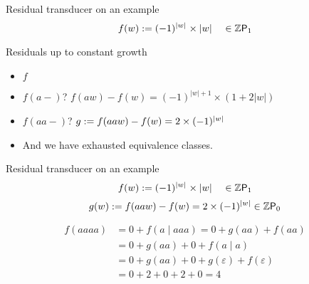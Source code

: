 \documentclass{beamer}
\begin{document}
\begin{frame}{Residual transducer on an example}
    \begin{equation*}
        f(w) \defined (-1)^{\size{w}} \times \size{w}
        \quad 
        \in \Zpoly[1]
    \end{equation*}
    \pause
    \begin{block}{Residuals up to constant growth}
        \begin{itemize}
            \item $f$ \pause
            \item $f(a-)$? 
                \pause $f(aw) - f(w) = (-1)^{|w| + 1} \times ( 1 + 2|w| )$
                \pause \nokmark
            \item $f(aa-)$? 
                \pause
                $g \mathrel{:=} f(aaw) - f(w)
                = 2 \times (-1)^{|w|}$
                \pause 
                \okmark
            \item And we have exhausted equivalence classes.
        \end{itemize}
    \end{block}
    \pause
\end{frame}
\begin{frame}{Residual transducer on an example}
    \begin{equation*}
        f(w) \defined (-1)^{\size{w}} \times \size{w}
        \quad 
        \in \Zpoly[1]
    \end{equation*}
    \begin{equation*}
        g(w) \defined f(aaw) - f(w) = 2 \times (-1)^{|w|} \in \Zpoly[0]
    \end{equation*}
    \begin{center}
    \end{center}
    \pause
    \begin{align*}
        f(aaaa) &= 0 + f(a \mid aaa) = 0 + g(aa) + f(aa) \\
                 &= 0 + g(aa) + 0 + f(a \mid a) \\
                 &= 0 + g(aa) + 0 + g(\varepsilon) + f(\varepsilon) \\
                 &= 0 + 2 + 0 + 2 + 0 = 4
    \end{align*}
\end{frame}
\end{document}
